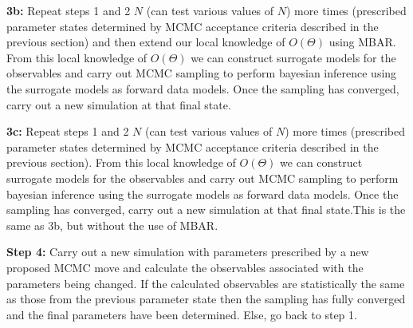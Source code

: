 \documentclass{report}
\begin{document}
\begin{outline}
\begin{outline}
\begin{outline}
\begin{outline}
\begin{outline}
\begin{outline}
\begin{outline}
            \item{\textbf{3b:} Repeat steps 1 and 2 $N$ (can test various values of $N$) more times (prescribed parameter states determined by MCMC acceptance criteria described in the previous section) and then extend 
                               our local knowledge of $O\left(\Theta\right)$ using MBAR. From this local knowledge of $O\left(\Theta\right)$ we can construct surrogate models for the observables and carry out MCMC sampling 
                               to perform bayesian inference using the surrogate models as forward data models. Once the sampling has converged, carry out a new simulation at that final state.}
            \item{\textbf{3c:} Repeat steps 1 and 2 $N$ (can test various values of $N$) more times (prescribed parameter states determined by MCMC acceptance criteria described in the previous section).
                               From this local knowledge of $O\left(\Theta\right)$ we can construct surrogate models for the observables and carry out MCMC sampling to perform bayesian inference using 
                               the surrogate models as forward data models. Once the sampling has converged, carry out a new simulation at that final state.This is the same as 3b, but without the use of MBAR.}
          \end{outline}
          \item{\textbf{Step 4:} Carry out a new simulation with parameters prescribed by a new proposed MCMC move and calculate the observables associated
                with the parameters being changed. If the calculated observables are statistically the same as those from the previous parameter state then
                the sampling has fully converged and the final parameters have been determined. Else, go back to step 1.}
        \end{outline}
      \end{outline}
    \end{outline}
  \end{outline} 
     

\end{outline}
\end{outline}
\end{document}
